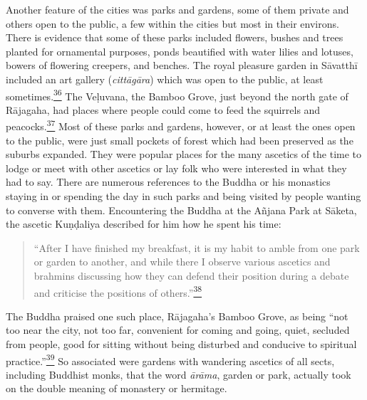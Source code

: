 Another feature of the cities was parks and gardens, some of them
private and others open to the public, a few within the cities but most
in their environs. There is evidence that some of these parks included
flowers, bushes and trees planted for ornamental purposes, ponds
beautified with water lilies and lotuses, bowers of flowering creepers,
and benches. The royal pleasure garden in Sāvatthī included an art
gallery (\emph{cittāgāra}) which was open to the public, at least
sometimes.\label{footprints_split_006.html_fnref36}\hyperref[footprints_split_024.htmlux5cux23fn36]{\textsuperscript{36}}
The Veḷuvana, the Bamboo Grove, just beyond the north gate of Rājagaha,
had places where people could come to feed the squirrels and
peacocks.\label{footprints_split_006.html_fnref37}\hyperref[footprints_split_024.htmlux5cux23fn37]{\textsuperscript{37}}
Most of these parks and gardens, however, or at least the ones open to
the public, were just small pockets of forest which had been preserved
as the suburbs expanded. They were popular places for the many ascetics
of the time to lodge or meet with other ascetics or lay folk who were
interested in what they had to say. There are numerous references to the
Buddha or his monastics staying in or spending the day in such parks and
being visited by people wanting to converse with them. Encountering the
Buddha at the Añjana Park at Sāketa, the ascetic Kuṇḍaliya described for
him how he spent his time:

\begin{quote}
``After I have finished my breakfast, it is my habit to amble from one
park or garden to another, and while there I observe various ascetics
and brahmins discussing how they can defend their position during a
debate and criticise the positions of
others.''\label{footprints_split_006.html_fnref38}\hyperref[footprints_split_024.htmlux5cux23fn38]{\textsuperscript{38}}
\end{quote}

The Buddha praised one such place, Rājagaha's Bamboo Grove, as being
``not too near the city, not too far, convenient for coming and going,
quiet, secluded from people, good for sitting without being disturbed
and conducive to spiritual
practice.''\label{footprints_split_006.html_fnref39}\hyperref[footprints_split_024.htmlux5cux23fn39]{\textsuperscript{39}}
So associated were gardens with wandering ascetics of all sects,
including Buddhist monks, that the word \emph{ārāma}, garden or park,
actually took on the double meaning of monastery or hermitage.

